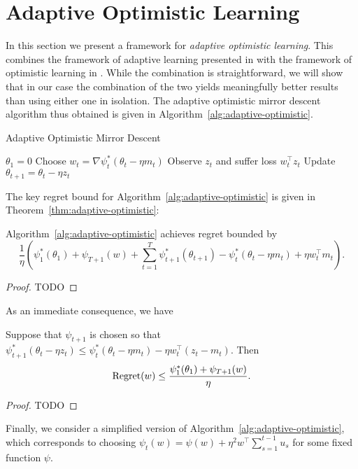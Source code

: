 \documentclass[paper_icml.tex]{subfiles}
\begin{document}
\section{Adaptive Optimistic Learning} 
\label{sec:machinery}
In this section we present a framework for \emph{adaptive optimistic learning}. 
This combines the framework of adaptive learning presented in \cite{orabona2013general} with 
the framework of optimistic learning in \cite{rakhlin2012}. While the combination is 
straightforward, we will show that in our case the combination of the two yields meaningfully 
better results than using either one in isolation. The adaptive optimistic mirror descent 
algorithm thus obtained is given in Algorithm~\ref{alg:adaptive-optimistic}.

\begin{algorithm}
\caption{Adaptive Optimistic Mirror Descent}
\label{alg:adaptive-optimistic}
\begin{algorithmic}
\STATE $\theta_1 = 0$
  \STATE Choose $w_t = \nabla \psi_t^*(\theta_t - \eta m_t)$
  \STATE Observe $z_t$ and suffer loss $w_t^{\top}z_t$
  \STATE Update $\theta_{t+1} = \theta_t - \eta z_t$
\ENDFOR
\end{algorithmic}
\end{algorithm}

The key regret bound for Algorithm~\ref{alg:adaptive-optimistic} is 
given in Theorem~\ref{thm:adaptive-optimistic}:
\begin{theorem}
\label{thm:adaptive-optimistic}
Algorithm~\ref{alg:adaptive-optimistic} achieves regret bounded by
\begin{equation}
\frac{1}{\eta}\left(\psi_1^*(\theta_1) + \psi_{T+1}(w) + \sum_{t=1}^{T} \psi_{t+1}^*(\theta_{t+1}) - \psi_t^*(\theta_t - \eta m_t) + \eta w_t^{\top}m_t\right).
\end{equation}
\end{theorem}
\begin{proof}
TODO
\end{proof}
As an immediate consequence, we have
\begin{corollary}
\label{cor:a-o1}
Suppose that $\psi_{t+1}$ is chosen so that $\psi_{t+1}^*(\theta_t - \eta z_t) \leq \psi_t^*(\theta_t - \eta m_t) - \eta w_t^{\top}(z_t - m_t)$. Then
\begin{equation}
\operatorname{Regret}(w) \leq \frac{\psi_1^*(\theta_1) + \psi_{T+1}(w)}{\eta}.
\end{equation}
\end{corollary}
\begin{proof}
TODO
\end{proof}
Finally, we consider a simplified version of Algorithm~\ref{alg:adaptive-optimistic}, 
which corresponds to choosing $\psi_t(w) = \psi(w) + \eta^2 w^{\top} \sum_{s=1}^{t-1} u_s$ 
for some fixed function $\psi$.
\end{document}
